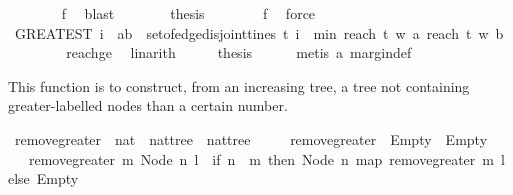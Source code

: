 \begin{isabellebody}
\ \ \ \ \ \ \isamarkupfalse%
\ f{}\ \isamarkupfalse%
\ blast\isanewline
\ \ \ \ \isamarkupfalse%
\ \isamarkupfalse%
\ {\isacharquery}thesis\isanewline
\ \ \ \ \ \ \isamarkupfalse%
\ f{}\ \isamarkupfalse%
\ force\isanewline
\ \ \isamarkupfalse%
\isanewline
\ \ \ \isamarkupfalse%
\ \isamarkupfalse%
\ {\isachardoublequoteopen}{\isacharparenleft}GREATEST\ i{\isachardot}\ {\isacharparenleft}{\isasymexists}\ {\isacharparenleft}a{\isacharcomma}b{\isacharparenright}\ {\isasymin}\ set{\isacharunderscore}of{\isacharunderscore}edge{\isacharunderscore}disjoint{\isacharunderscore}tines\ t{\isachardot}\ i\ {\isacharequal}\ min\ {\isacharparenleft}reach\ t\ w\ a{\isacharparenright}\ {\isacharparenleft}reach\ t\ w\ b{\isacharparenright}{\isacharparenright}{\isacharparenright}\ {\isasymge}\ {}{\isachardoublequoteclose}\isanewline
\ \ \ \ \ \isamarkupfalse%
\ reachge{}\ \isamarkupfalse%
\ linarith\isanewline
\ \ \isamarkupfalse%
\ \isamarkupfalse%
\ {\isacharquery}thesis\isanewline
\ \ \ \ \isamarkupfalse%
\ {\isacharparenleft}metis\ a\ margin{\isacharunderscore}def{\isacharparenright}\ \isanewline
\ \ \isamarkupfalse%
%
\endisatagproof
{\isafoldproof}%
%
\isadelimproof
%
\endisadelimproof
%
\begin{isamarkuptext}%
This function is to construct, from an increasing tree, a tree not containing greater-labelled 
nodes than a certain number.%
\end{isamarkuptext}\isamarkuptrue%
\isamarkupfalse%
\ remove{\isacharunderscore}greater\ {\isacharcolon}{\isacharcolon}\ {\isachardoublequoteopen}nat\ {\isasymRightarrow}\ nattree\ {\isasymRightarrow}\ nattree{\isachardoublequoteclose}\ \isanewline
\ \ \ \ {\isachardoublequoteopen}remove{\isacharunderscore}greater\ {\isacharunderscore}\ Empty\ {\isacharequal}\ Empty{\isachardoublequoteclose}\ \isanewline
\ \ {\isacharbar}\ {\isachardoublequoteopen}remove{\isacharunderscore}greater\ m\ {\isacharparenleft}Node\ n\ l{\isacharparenright}\ {\isacharequal}\ {\isacharparenleft}if\ n\ {\isacharless}\ m\ then\ Node\ n\ {\isacharparenleft}map\ {\isacharparenleft}remove{\isacharunderscore}greater\ m{\isacharparenright}\ l{\isacharparenright}\ else\ Empty{\isacharparenright}{\isachardoublequoteclose}\isanewline
\isanewline
{}\isamarkupfalse%

\end{isabellebody}
